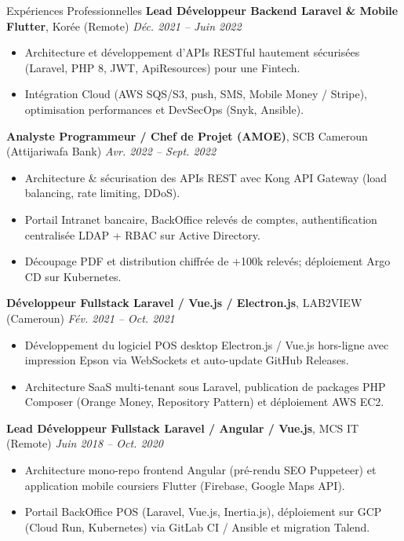 \documentclass{resume}
\begin{document}
\begin{rSection}{Expériences Professionnelles}
{\bf Lead Développeur Backend Laravel \& Mobile Flutter}, Korée (Remote) \hfill {\em Déc. 2021 -- Juin 2022}
\begin{itemize} \itemsep -0.3em
    \item Architecture et développement d'APIs RESTful hautement sécurisées (Laravel, PHP 8, JWT, ApiResources) pour une Fintech.
    \item Intégration Cloud (AWS SQS/S3, push, SMS, Mobile Money / Stripe), optimisation performances et DevSecOps (Snyk, Ansible).
\end{itemize}

{\bf Analyste Programmeur / Chef de Projet (AMOE)}, SCB Cameroun (Attijariwafa Bank) \hfill {\em Avr. 2022 -- Sept. 2022}
\begin{itemize} \itemsep -0.3em
    \item Architecture \& sécurisation des APIs REST avec Kong API Gateway (load balancing, rate limiting, DDoS).
    \item Portail Intranet bancaire, BackOffice relevés de comptes, authentification centralisée LDAP + RBAC sur Active Directory.
    \item Découpage PDF et distribution chiffrée de +100k relevés; déploiement Argo CD sur Kubernetes.
\end{itemize}

{\bf Développeur Fullstack Laravel / Vue.js / Electron.js}, LAB2VIEW (Cameroun) \hfill {\em Fév. 2021 -- Oct. 2021}
\begin{itemize} \itemsep -0.3em
    \item Développement du logiciel POS desktop Electron.js / Vue.js hors-ligne avec impression Epson via WebSockets et auto-update GitHub Releases.
    \item Architecture SaaS multi-tenant sous Laravel, publication de packages PHP Composer (Orange Money, Repository Pattern) et déploiement AWS EC2.
\end{itemize}

{\bf Lead Développeur Fullstack Laravel / Angular / Vue.js}, MCS IT (Remote) \hfill {\em Juin 2018 -- Oct. 2020}
\begin{itemize} \itemsep -0.3em
    \item Architecture mono-repo frontend Angular (pré-rendu SEO Puppeteer) et application mobile coursiers Flutter (Firebase, Google Maps API).
    \item Portail BackOffice POS (Laravel, Vue.js, Inertia.js), déploiement sur GCP (Cloud Run, Kubernetes) via GitLab CI / Ansible et migration Talend.
\end{itemize}

\end{rSection}
\end{document}
